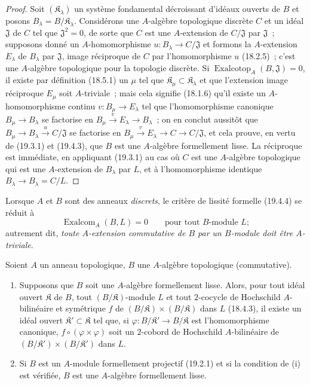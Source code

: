 \begin{proof}
Soit $(\mathfrak K_\lambda)$ un système fondamental décroissant d'idéaux
ouverts de $B$ et posons $B_\lambda=B/\mathfrak K_\lambda$.
Considérons une $A$-algèbre topologique discrète $C$ et un idéal
$\mathfrak J$ de $C$ tel que $\mathfrak J^2=0$, de sorte que $C$ est une
$A$-extension de $C/\mathfrak J$ par $\mathfrak J$~; supposons donné un
$A$-homomorphisme $u:B_\lambda\to C/\mathfrak J$ et formons la
$A$-extension $E_\lambda$ de $B_\lambda$ par $\mathfrak J$, image
réciproque de $C$ par l'homomorphisme $u$ (18.2.5)~; c'est une $A$-algèbre
topologique pour la topologie discrète. Si
$\operatorname{Exalcotop}_A(B,\mathfrak J)=0$, il existe par définition (18.5.1) un
$\mu$ tel que $\mathfrak K_\mu\subset\mathfrak K_\lambda$ et que
l'extension image réciproque $E_\mu$ soit $A$-triviale~; mais cela signifie
(18.1.6) qu'il existe un $A$-homomorphisme continu
$v:B_\mu\to E_\lambda$ tel que l'homomorphisme canonique
$B_\mu\to B_\lambda$ se factorise en
$B_\mu\xrightarrow{v}E_\lambda\to B_\lambda$~; on en conclut
aussitôt que $B_\mu\to B_\lambda\xrightarrow{u}C/\mathfrak J$ se
factorise en
$B_\mu\xrightarrow{v}E_\lambda\to C\to C/\mathfrak J$, et cela
prouve, en vertu de (19.3.1) et (19.4.3), que $B$ est une $A$-algèbre
formellement lisse. La réciproque est immédiate, en appliquant (19.3.1) au cas
où $C$ est une $A$-algèbre topologique qui est une $A$-extension de
$B_\lambda$ par $L$, et à l'homomorphisme identique
$B_\lambda\to B_\lambda=C/L$.
\end{proof}

Lorsque $A$ et $B$ sont des anneaux \emph{discrets}, le critère de lissité formelle
(19.4.4) se réduit à
\begin{equation}
\tag{19.4.4.1}
\label{0.19.4.4.1-fr}
\operatorname{Exalcom}_A(B,L)=0\qquad\text{pour tout $B$-module $L$};
\end{equation}
autrement dit, \emph{toute $A$-extension commutative de $B$ par un
$B$-module doit être $A$-triviale}.

\begin{corollary}[19.4.5]
\label{0.19.4.5-fr}
Soient $A$ un anneau topologique, $B$ une $A$-algèbre topologique
(commutative).
\begin{enumerate}
  \item[\textup{(i)}] Supposons que $B$ soit une $A$-algèbre formellement lisse.
  Alors, pour tout idéal ouvert $\mathfrak K$ de $B$, tout
  $(B/\mathfrak K)$-module $L$ et tout $2$-cocycle de Hochschild
  $A$-bilinéaire et symétrique $f$ de
  $(B/\mathfrak K)\times(B/\mathfrak K)$ dans $L$ \textup{(18.4.3)}, il existe un
  idéal ouvert $\mathfrak K'\subset\mathfrak K$ tel que, si
  $\varphi:B/\mathfrak K'\to B/\mathfrak K$ est l'homomorphisme
  canonique, $f\circ(\varphi\times\varphi)$ soit un $2$-cobord de
  Hochschild $A$-bilinéaire de
  $(B/\mathfrak K')\times(B/\mathfrak K')$ dans $L$.
  \item[\textup{(ii)}] Si $B$ est un $A$-module formellement projectif \textup{(19.2.1)} et si
  la condition de \textup{(i)} est vérifiée, $B$ est une $A$-algèbre formellement
  lisse.
\end{enumerate}
\end{corollary}


